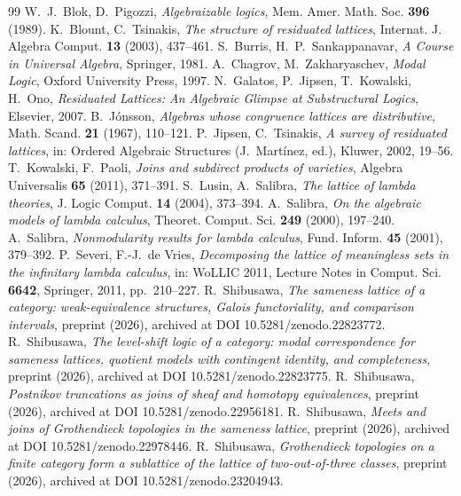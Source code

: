 \documentclass[11pt]{amsart}
\theoremstyle{definition}
\begin{document}
\begin{thebibliography}{99}
 W.~J.~Blok, D.~Pigozzi, \emph{Algebraizable logics}, Mem. Amer.
Math. Soc. \textbf{396} (1989).
 K.~Blount, C.~Tsinakis, \emph{The structure of residuated
lattices}, Internat. J. Algebra Comput. \textbf{13} (2003), 437--461.
 S.~Burris, H.~P.~Sankappanavar, \emph{A Course in Universal
Algebra}, Springer, 1981.
 A.~Chagrov, M.~Zakharyaschev, \emph{Modal Logic}, Oxford University
Press, 1997.
 N.~Galatos, P.~Jipsen, T.~Kowalski, H.~Ono, \emph{Residuated
Lattices: An Algebraic Glimpse at Substructural Logics}, Elsevier, 2007.
 B.~Jónsson, \emph{Algebras whose congruence lattices are
distributive}, Math. Scand. \textbf{21} (1967), 110--121.
 P.~Jipsen, C.~Tsinakis, \emph{A survey of residuated lattices},
in: Ordered Algebraic Structures (J.~Martínez, ed.), Kluwer, 2002, 19--56.
 T.~Kowalski, F.~Paoli, \emph{Joins and subdirect products of
varieties}, Algebra Universalis \textbf{65} (2011), 371--391.
 S.~Lusin, A.~Salibra, \emph{The lattice of lambda theories},
J. Logic Comput. \textbf{14} (2004), 373--394.
 A.~Salibra, \emph{On the algebraic models of lambda
calculus}, Theoret. Comput. Sci. \textbf{249} (2000), 197--240.
 A.~Salibra, \emph{Nonmodularity results for lambda
calculus}, Fund. Inform. \textbf{45} (2001), 379--392.
 P.~Severi, F.-J.~de Vries, \emph{Decomposing the lattice of
meaningless sets in the infinitary lambda calculus}, in: WoLLIC 2011, Lecture
Notes in Comput. Sci. \textbf{6642}, Springer, 2011, pp.~210--227.
 R.~Shibusawa, \emph{The sameness lattice of a category:
weak-equivalence structures, Galois functoriality, and comparison intervals},
preprint (2026), archived at DOI 10.5281/zenodo.22823772.
 R.~Shibusawa, \emph{The level-shift logic of a category: modal correspondence for sameness lattices, quotient models with contingent identity, and completeness},
preprint (2026), archived at DOI 10.5281/zenodo.22823775.
 R.~Shibusawa, \emph{Postnikov truncations as joins of sheaf
and homotopy equivalences}, preprint (2026), archived at DOI 10.5281/zenodo.22956181.
 R.~Shibusawa, \emph{Meets and joins of Grothendieck
topologies in the sameness lattice}, preprint (2026), archived at DOI
10.5281/zenodo.22978446.
 R.~Shibusawa, \emph{Grothendieck topologies on a finite
category form a sublattice of the lattice of two-out-of-three classes},
preprint (2026), archived at DOI 10.5281/zenodo.23204943.
\end{thebibliography}
\end{document}

